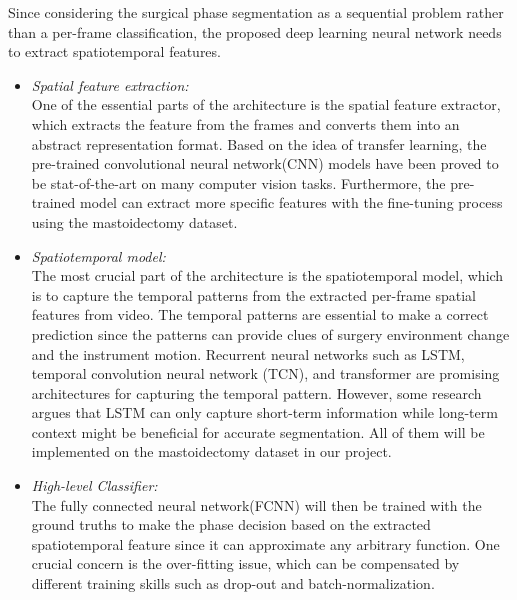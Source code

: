 \documentclass[11pt]{article} \usepackage[top=1in, bottom=1in, left=1in, right=1in]{geometry}
\begin{document}
Since considering the surgical phase segmentation as a sequential problem rather than a per-frame classification, the proposed deep learning neural network needs to extract spatiotemporal features.
\begin{itemize}
    \item \textit{Spatial feature extraction:}\\
    One of the essential parts of the architecture is the spatial feature extractor, which extracts the feature from the frames and converts them into an abstract representation format. Based on the idea of transfer learning, the pre-trained convolutional neural network(CNN) models have been proved to be stat-of-the-art on many computer vision tasks. Furthermore, the pre-trained model can extract more specific features with the fine-tuning process using the mastoidectomy dataset. 
    \item \textit{Spatiotemporal model:}\\
   The most crucial part of the architecture is the spatiotemporal model, which is to capture the temporal patterns from the extracted per-frame spatial features from video. The temporal patterns are essential to make a correct prediction since the patterns can provide clues of surgery environment change and the instrument motion. Recurrent neural networks such as LSTM, temporal convolution neural network (TCN), and transformer are promising architectures for capturing the temporal pattern. However, some research argues that LSTM can only capture short-term information while long-term context might be beneficial for accurate segmentation. All of them will be implemented on the mastoidectomy dataset in our project.
   \item \textit{High-level Classifier:}\\
   The fully connected neural network(FCNN) will then be trained with the ground truths to make the phase decision based on the extracted spatiotemporal feature since it can approximate any arbitrary function. One crucial concern is the over-fitting issue, which can be compensated by different training skills such as drop-out and batch-normalization. 
\end{itemize}
\end{document}
